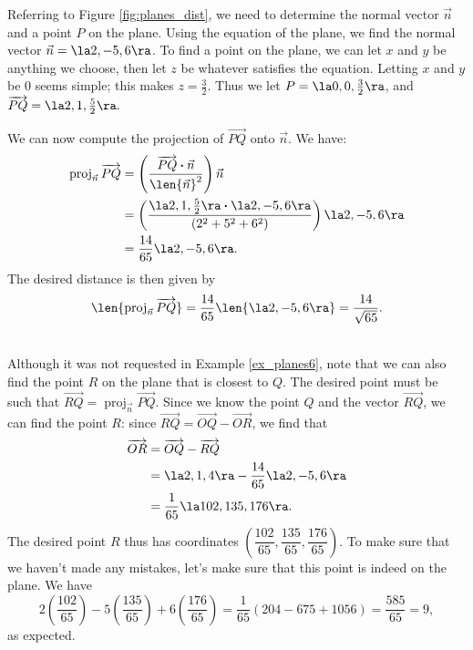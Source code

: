 {Referring to Figure \ref{fig:planes_dist}, we need to determine the normal vector $\vec n$ and a point $P$ on the plane. Using the equation of the plane, we find the normal vector $\vec n = \la 2,-5,6\ra$. To find a point on the plane, we can let $x$ and $y$ be anything we choose, then let $z$ be whatever satisfies the equation. Letting $x$ and $y$ be 0 seems simple; this makes $z = \frac{3}{2}$. Thus we let $P = \la 0,0,\frac{3}{2}\ra$, and $\overrightarrow{PQ} = \la 2,1,\frac{5}{2}\ra.$

We can now compute the projection of $\overrightarrow{PQ}$ onto $\vec n$. We have:
\begin{align*}
\operatorname{proj}_{\vec n}\overrightarrow{PQ} & = \left(\frac{\overrightarrow{PQ}\boldsymbol{\cdot}\vec n}{\len{\vec n}^2}\right)\vec n\\
 & = \left(\frac{\la 2, 1, \frac{5}{2}\ra \boldsymbol{\cdot} \la 2, -5, 6\ra}{(2^2+5^2+6^2)}\right)\la 2, -5, 6\ra\\
 & = \frac{14}{65}\la 2, -5, 6\ra.
\end{align*}
The desired distance is then given by
\[
\len{\operatorname{proj}_{\vec n}\overrightarrow{PQ}} = \frac{14}{65}\len{\la 2, -5, 6\ra} = \frac{14}{\sqrt{65}}.
\]
\baselineskip
}\\

Although it was not requested in Example \ref{ex_planes6}, note that we can also find the point $R$ on the plane that is closest to $Q$. The desired point must be such that $\overrightarrow{RQ} = \operatorname{proj}_{\vec n}\overrightarrow{PQ}$. Since we know the point $Q$ and the vector $\overrightarrow{RQ}$, we can find the point $R$: since $\overrightarrow{RQ} = \overrightarrow{OQ}-\overrightarrow{OR}$, we find that
\begin{align*}
\overrightarrow{OR} & = \overrightarrow{OQ}-\overrightarrow{RQ}\\
 & = \la 2, 1, 4\ra - \frac{14}{65}\la 2, -5, 6\ra\\
 & = \frac{1}{65}\la 102, 135, 176\ra.
\end{align*}
The desired point $R$ thus has coordinates $\left(\dfrac{102}{65}, \dfrac{135}{65}, \dfrac{176}{65}\right)$. To make sure that we haven't made any mistakes, let's make sure that this point is indeed on the plane. We have
\[
2\left(\frac{102}{65}\right)-5\left(\frac{135}{65}\right)+6\left(\frac{176}{65}\right) = \frac{1}{65}(204-675+1056) = \frac{585}{65}=9,
\]
as expected.\\

